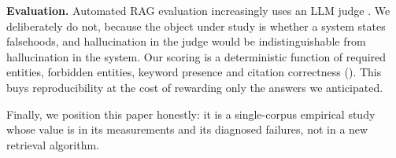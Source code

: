 \textbf{Evaluation.} Automated RAG evaluation increasingly uses an LLM judge
\citep{es2024ragas}. We deliberately do not, because the object under study is
whether a system states falsehoods, and hallucination in the judge
\citep{ji2023hallucination} would be indistinguishable from hallucination in the
system. Our scoring is a deterministic function of required entities, forbidden
entities, keyword presence and citation correctness (). This
buys reproducibility at the cost of rewarding only the answers we anticipated.

Finally, we position this paper honestly: it is a single-corpus empirical study
whose value is in its measurements and its diagnosed failures, not in a new
retrieval algorithm.
